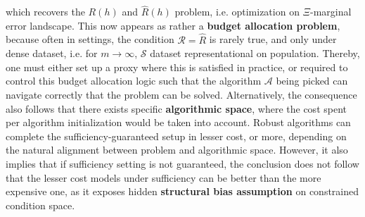 which recovers the $R(h)$ and $\hat{R}(h)$ problem, i.e. optimization on $\Xi$-marginal error landscape. This now appears as rather a \textbf{budget allocation problem}, because often in settings, the condition $\mathcal{R}= \hat{R}$ is rarely true, and only under dense dataset, i.e. for $m\to\infty$, $\mathcal{S}$ dataset representational on population. Thereby, one must either set up a proxy where this is satisfied in practice, or required to control this budget allocation logic such that the algorithm $\mathcal{A}$ being picked can navigate correctly that the problem can be solved. Alternatively, the consequence also follows that there exists specific \textbf{algorithmic space}, where the cost spent per algorithm initialization would be taken into account. Robust algorithms can complete the sufficiency-guaranteed setup in lesser cost, or more, depending on the natural alignment between problem and algorithmic space. However, it also implies that if sufficiency setting is not guaranteed, the conclusion does not follow that the lesser cost models under sufficiency can be better than the more expensive one, as it exposes hidden \textbf{structural bias assumption} on constrained condition space.  


